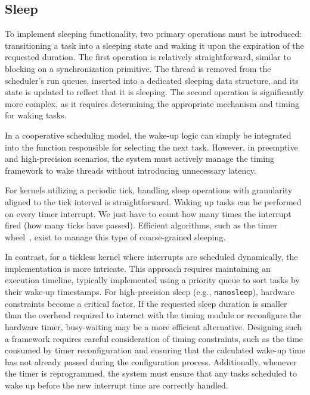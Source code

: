\documentclass[a4paper,10pt,twoside]{report}
\theoremstyle{definition}
\begin{document}
\subsection{Sleep}

To implement sleeping functionality, two primary operations must be introduced: transitioning a task into a sleeping state and waking it upon the expiration of the requested duration. The first operation is relatively straightforward, similar to blocking on a synchronization primitive. The thread is removed from the scheduler's run queues, inserted into a dedicated sleeping data structure, and its state is updated to reflect that it is sleeping. The second operation is significantly more complex, as it requires determining the appropriate mechanism and timing for waking tasks.

In a cooperative scheduling model, the wake-up logic can simply be integrated into the function responsible for selecting the next task. However, in preemptive and high-precision scenarios, the system must actively manage the timing framework to wake threads without introducing unnecessary latency.

For kernels utilizing a periodic tick, handling sleep operations with granularity aligned to the tick interval is straightforward. Waking up tasks can be performed on every timer interrupt. We just have to count how many times the interrupt fired (how many ticks have passed). Efficient algorithms, such as the timer wheel~\cite{linux_timer_wheel}, exist to manage this type of coarse-grained sleeping.

In contrast, for a tickless kernel where interrupts are scheduled dynamically, the implementation is more intricate. This approach requires maintaining an execution timeline, typically implemented using a priority queue to sort tasks by their wake-up timestamps. For high-precision sleep (e.g., \texttt{nanosleep}), hardware constraints become a critical factor. If the requested sleep duration is smaller than the overhead required to interact with the timing module or reconfigure the hardware timer, busy-waiting may be a more efficient alternative. Designing such a framework requires careful consideration of timing constraints, such as the time consumed by timer reconfiguration and ensuring that the calculated wake-up time has not already passed during the configuration process. Additionally, whenever the timer is reprogrammed, the system must ensure that any tasks scheduled to wake up before the new interrupt time are correctly handled.
\end{document}

